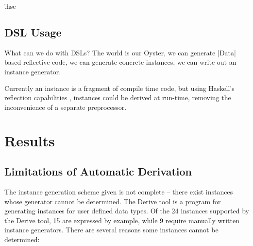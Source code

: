 \documentclass[preprint,draft]{sigplanconf}
\begin{document}
\h{.hse}

\subsection{DSL Usage}

What can we do with DSLs? The world is our Oyster, we can generate |Data| based reflective code, we can generate concrete instances, we can write out an instance generator.

Currently an instance is a fragment of compile time code, but using Haskell's reflection capabilities \cite{lammel:syb2}, instances could be derived at run-time, removing the inconvenience of a separate preprocessor.

\section{Results}
\label{sec:results}

\subsection{Limitations of Automatic Derivation}
\label{sec:failure}

The instance generation scheme given is not complete -- there exist instances whose generator cannot be determined. The Derive tool \cite{derive} is a program for generating instances for user defined data types. Of the 24 instances supported by the Derive tool, 15 are expressed by example, while 9 require manually written instance generators. There are several reasons some instances cannot be determined:
\end{document}
